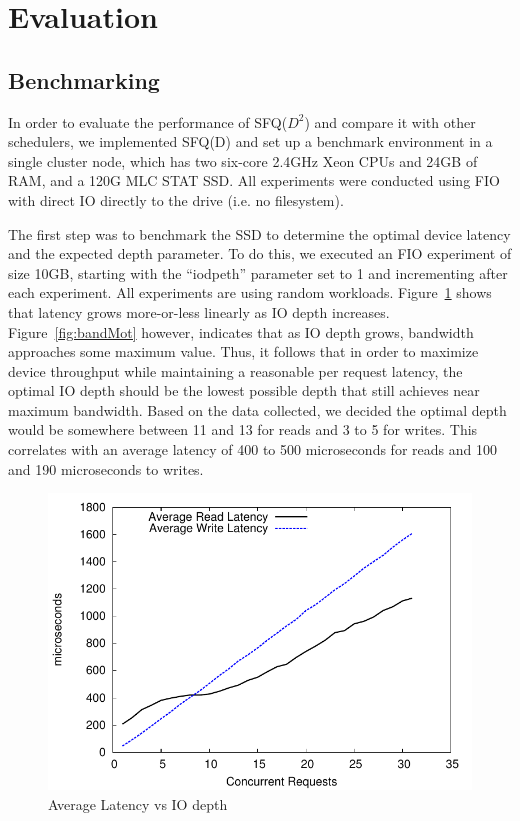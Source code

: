 \section{Evaluation}

\subsection{Benchmarking}

In order to evaluate the performance of SFQ($D^2$) and compare it with
other schedulers, we implemented SFQ(D) and set up a benchmark
environment in a single cluster node, which has two six-core 2.4GHz Xeon CPUs
and 24GB of RAM, and a 120G MLC STAT SSD.
All experiments were conducted using FIO with direct IO directly
to the drive (i.e. no filesystem).

The first step was to benchmark the SSD to determine the optimal
device latency and the expected depth parameter. To do this, we
executed an FIO experiment of size 10GB, starting with the ``iodpeth''
parameter set to 1 and incrementing after each experiment. All
experiments are using random workloads. Figure~\ref{fig:latMot} shows
that latency grows more-or-less linearly as IO depth
increases. Figure~\ref{fig:bandMot} however, indicates that as IO
depth grows, bandwidth approaches some maximum value. Thus, it follows
that in order to maximize device throughput while maintaining a
reasonable per request latency, the optimal IO depth should be the
lowest possible depth that still achieves near maximum
bandwidth. Based on the data collected, we decided the optimal depth
would be somewhere between 11 and 13 for reads and 3 to 5 for
writes. This correlates with an average latency of 400 to 500
microseconds for reads and 100 and 190 microseconds to writes.

\begin{figure}[t]
  \centering \includegraphics[width=\linewidth]{../../graphs/noop/latency_motivation.pdf}
  \caption{Average Latency vs IO depth}
  \label{fig:latMot}
\end{figure} 

